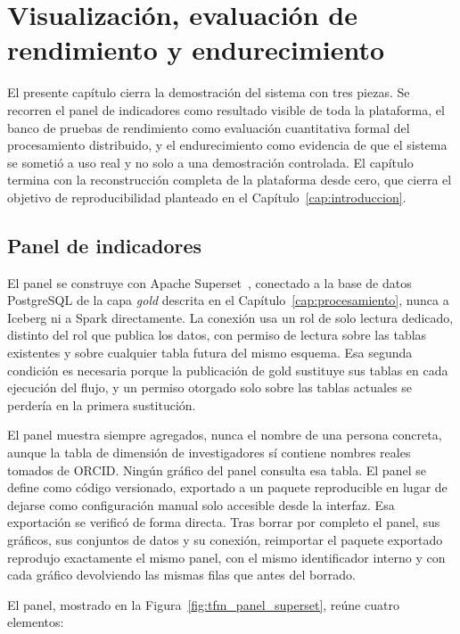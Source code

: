 \chapter{Visualización, evaluación de rendimiento y endurecimiento}
\label{cap:visualizacion}

El presente capítulo cierra la demostración del sistema con tres piezas.
Se recorren el panel de indicadores como resultado visible de toda la
plataforma, el banco de pruebas de rendimiento como evaluación
cuantitativa formal del procesamiento distribuido, y el endurecimiento
como evidencia de que el sistema se sometió a uso real y no solo a una
demostración controlada. El capítulo termina con la reconstrucción
completa de la plataforma desde cero, que cierra el objetivo de
reproducibilidad planteado en el Capítulo~\ref{cap:introduccion}.

\section{Panel de indicadores}
\label{sec:visualizacion_panel}

El panel se construye con Apache Superset~\cite{apache_superset_docs},
conectado a la base de datos PostgreSQL de la capa \textit{gold} descrita
en el Capítulo~\ref{cap:procesamiento}, nunca a Iceberg ni a Spark
directamente. La conexión usa un rol de solo lectura dedicado, distinto
del rol que publica los datos, con permiso de lectura sobre las tablas
existentes y sobre cualquier tabla futura del mismo esquema. Esa segunda
condición es necesaria porque la publicación de gold sustituye sus tablas
en cada ejecución del flujo, y un permiso otorgado solo sobre las tablas
actuales se perdería en la primera sustitución.

El panel muestra siempre agregados, nunca el nombre de una persona
concreta, aunque la tabla de dimensión de investigadores sí contiene
nombres reales tomados de ORCID. Ningún gráfico del panel consulta esa
tabla. El panel se define como código versionado, exportado a un paquete
reproducible en lugar de dejarse como configuración manual solo accesible
desde la interfaz. Esa exportación se verificó de forma directa. Tras
borrar por completo el panel, sus gráficos, sus conjuntos de datos y su
conexión, reimportar el paquete exportado reprodujo exactamente el mismo
panel, con el mismo identificador interno y con cada gráfico devolviendo
las mismas filas que antes del borrado.

El panel, mostrado en la Figura~\ref{fig:tfm_panel_superset}, reúne
cuatro elementos:

